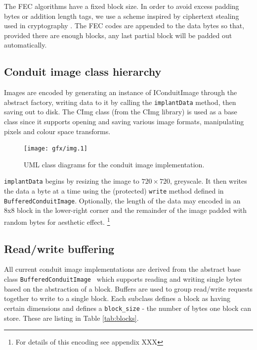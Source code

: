The FEC algorithms have a fixed block size. In order to avoid excess padding bytes or addition length tags, we use a scheme inspired by ciphertext stealing used in cryptography \cite{XXX}. The FEC codes are appended to the data bytes so that, provided there are enough blocks, any last partial block will be padded out automatically.


\FloatBarrier
\subsection{Conduit image class hierarchy}

Images are encoded by generating an instance of IConduitImage through the abstract factory, writing data to it by calling the {\tt implantData} method, then saving out to disk. The CImg class (from the CImg library) is used as a base class since it supports opening and saving various image formats, manipulating pixels and colour space transforms.

    \begin{figure}[tbp]
        \begin{center}
                \texttt{[image: gfx/img.1]}
            \caption{UML class diagrams for the conduit image implementation.}
            \label{uml:img-classes}
        \end{center}
    \end{figure}
    
{\tt implantData} begins by resizing the image to $720 \times 720$, greyscale. It then writes the data a byte at a time using the (protected) {\tt write} method defined in {\tt BufferedConduitImage}. Optionally, the length of the data may encoded in an 8x8 block in the lower-right corner and the remainder of the image padded with random bytes for aesthetic effect. \footnote{For details of this encoding see appendix XXX}


\FloatBarrier
\subsection{Read/write buffering}

All current conduit image implementations are derived from the abstract base class {\tt BufferedConduitImage } which supports reading and writing single bytes based on the abstraction of a block. Buffers are used to group read/write requests together to write to a single block. Each subclass defines a block as having certain dimensions and defines a {\tt block\_size} - the number of bytes one block can store. These are listing in Table \ref{tab:blocks}.

